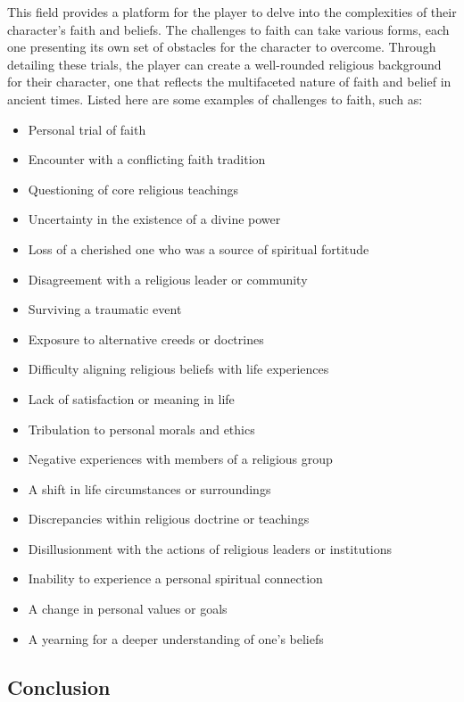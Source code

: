 This field provides a platform for the player to delve into the complexities of their character's faith and beliefs. The challenges to faith can take various forms, each one presenting its own set of obstacles for the character to overcome. Through detailing these trials, the player can create a well-rounded religious background for their character, one that reflects the multifaceted nature of faith and belief in ancient times. Listed here are some examples of challenges to faith, such as:

\begin{itemize}
    \item Personal trial of faith
    \item Encounter with a conflicting faith tradition
    \item Questioning of core religious teachings
    \item Uncertainty in the existence of a divine power
    \item Loss of a cherished one who was a source of spiritual fortitude
    \item Disagreement with a religious leader or community
    \item Surviving a traumatic event
    \item Exposure to alternative creeds or doctrines
    \item Difficulty aligning religious beliefs with life experiences
    \item Lack of satisfaction or meaning in life
    \item Tribulation to personal morals and ethics
    \item Negative experiences with members of a religious group
    \item A shift in life circumstances or surroundings
    \item Discrepancies within religious doctrine or teachings
    \item Disillusionment with the actions of religious leaders or institutions
    \item Inability to experience a personal spiritual connection
    \item A change in personal values or goals
    \item A yearning for a deeper understanding of one's beliefs
\end{itemize}

\subsection{\textbf{Conclusion}}

